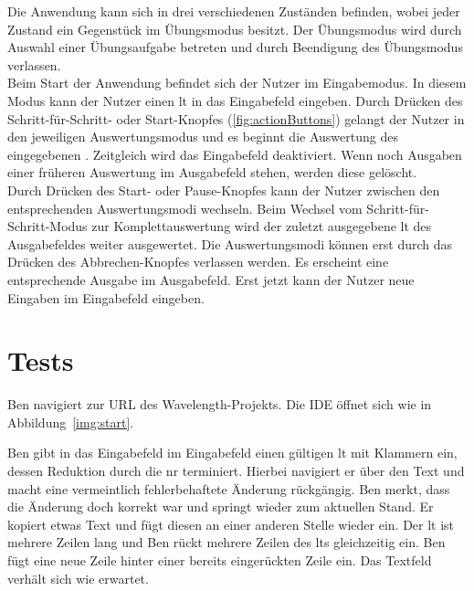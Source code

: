 \documentclass[parskip=full,11pt,twoside]{scrartcl}
\begin{document}
Die Anwendung kann sich in drei verschiedenen Zuständen befinden, wobei jeder Zustand ein Gegenstück im Übungsmodus besitzt. 
Der Übungsmodus wird durch Auswahl einer Übungsaufgabe betreten und durch Beendigung des Übungsmodus verlassen.\\
Beim Start der Anwendung befindet sich der Nutzer im Eingabemodus. In diesem Modus kann der Nutzer einen \gls{lt} in das Eingabefeld eingeben. 
Durch Drücken des Schritt-für-Schritt- oder Start-Knopfes (\cref{fig:actionButtons}) gelangt der Nutzer in den jeweiligen Auswertungsmodus und es beginnt die Auswertung des eingegebenen . 
Zeitgleich wird das Eingabefeld deaktiviert. Wenn noch Ausgaben einer früheren Auswertung im Ausgabefeld stehen, werden diese gelöscht.\\ 
Durch Drücken des Start- oder Pause-Knopfes kann der Nutzer zwischen den entsprechenden Auswertungsmodi wechseln. 
Beim Wechsel vom Schritt-für-Schritt-Modus zur Komplettauswertung wird der zuletzt ausgegebene \gls{lt} des Ausgabefeldes weiter ausgewertet.
Die Auswertungsmodi können erst durch das Drücken des Abbrechen-Knopfes verlassen werden. Es erscheint eine entsprechende Ausgabe im Ausgabefeld. Erst jetzt kann der Nutzer neue Eingaben im Eingabefeld eingeben.


\section{Tests}


{Ben navigiert zur URL des Wavelength-Projekts.}
{Die IDE öffnet sich wie in Abbildung~\ref{img:start}.}

{Ben gibt in das Eingabefeld im Eingabefeld einen gültigen \gls{lt} mit Klammern ein,
dessen Reduktion durch die \gls{nr} terminiert.
Hierbei navigiert er über den Text und macht eine vermeintlich fehlerbehaftete Änderung rückgängig. 
Ben merkt, dass die Änderung doch korrekt war und springt wieder zum aktuellen Stand. Er kopiert etwas Text und fügt diesen an einer anderen Stelle wieder ein.
Der \gls{lt} ist mehrere Zeilen lang und Ben rückt mehrere Zeilen des \gls{lt}s gleichzeitig ein.
Ben fügt eine neue Zeile hinter einer bereits eingerückten Zeile ein.}
{Das Textfeld verhält sich wie erwartet.}
\end{document}
